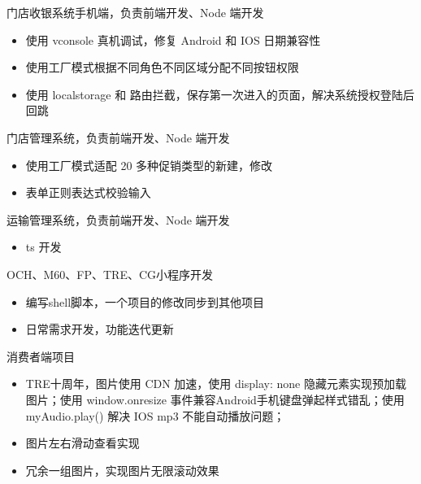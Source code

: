 \documentclass{resume}
\begin{document}
\begin{onehalfspacing}
门店收银系统手机端，负责前端开发、Node 端开发
\begin{itemize}
  \item 使用 vconsole 真机调试，修复 Android 和 IOS 日期兼容性
  \item 使用工厂模式根据不同角色不同区域分配不同按钮权限
  \item 使用 localstorage 和 路由拦截，保存第一次进入的页面，解决系统授权登陆后回跳
\end{itemize}
\end{onehalfspacing}

\begin{onehalfspacing}
门店管理系统，负责前端开发、Node 端开发
\begin{itemize}
  \item 使用工厂模式适配 20 多种促销类型的新建，修改
  \item 表单正则表达式校验输入
\end{itemize}
\end{onehalfspacing}

\begin{onehalfspacing}
运输管理系统，负责前端开发、Node 端开发
\begin{itemize}
  \item ts 开发
\end{itemize}
\end{onehalfspacing}

\begin{onehalfspacing}
OCH、M60、FP、TRE、CG小程序开发
\begin{itemize}
  \item 编写shell脚本，一个项目的修改同步到其他项目
  \item 日常需求开发，功能迭代更新
\end{itemize}
\end{onehalfspacing}

\begin{onehalfspacing}
消费者端项目
\begin{itemize}
  \item TRE十周年，图片使用 CDN 加速，使用 display: none 隐藏元素实现预加载图片；使用 window.onresize 事件兼容Android手机键盘弹起样式错乱；使用 myAudio.play() 解决 IOS mp3 不能自动播放问题；
  \item 图片左右滑动查看实现
  \item 冗余一组图片，实现图片无限滚动效果
\end{itemize}
\end{onehalfspacing}
\end{document}
